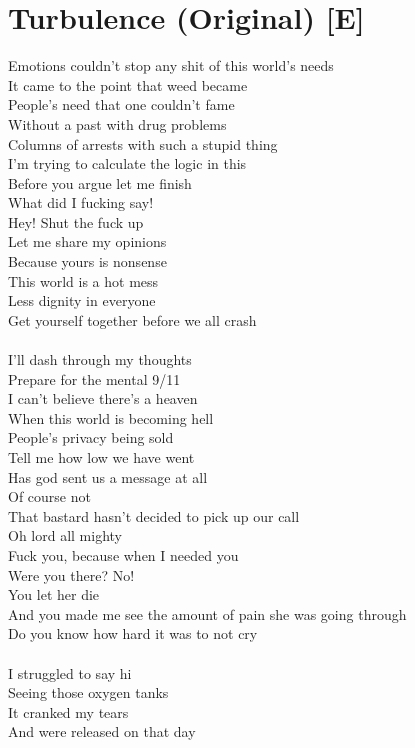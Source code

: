 \documentclass[12pt, b5paper, oneside]{book}
\begin{document}
\section{Turbulence (Original) [E]}
Emotions couldn't stop any shit of this world's needs
\\It came to the point that weed became
\\People's need that one couldn't fame
\\Without a past with drug problems
\\Columns of arrests with such a stupid thing
\\I'm trying to calculate the logic in this
\\Before you argue let me finish
\\What did I fucking say!
\\Hey! Shut the fuck up
\\Let me share my opinions
\\Because yours is nonsense
\\This world is a hot mess
\\Less dignity in everyone
\\Get yourself together before we all crash
%
\\\\I'll dash through my thoughts
\\Prepare for the mental 9/11
\\I can't believe there's a heaven
\\When this world is becoming hell
\\People's privacy being sold
\\Tell me how low we have went
\\Has god sent us a message at all
\\Of course not
\\That bastard hasn't decided to pick up our call
\\Oh lord all mighty
\\Fuck you, because when I needed you
\\Were you there? No!
\\You let her die
\\And you made me see the amount of pain she was going through
\\Do you know how hard it was to not cry
%
\\\\I struggled to say hi
\\Seeing those oxygen tanks
\\It cranked my tears
\\And were released on that day
\end{document}
